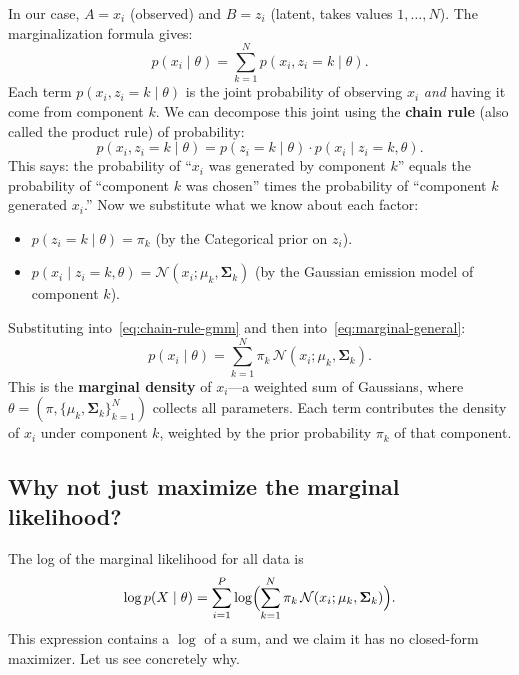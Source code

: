 \documentclass[11pt]{article}
\theoremstyle{definition}
\theoremstyle{plain}
\theoremstyle{remark}
\newcommand{\Sv}{\boldsymbol{\Sigma}}
\begin{document}
In our case, $A=x_i$ (observed) and $B=z_i$ (latent, takes values $1,\dots,N$). The marginalization formula gives:
\begin{equation}
  p(x_i\mid\theta) = \sum_{k=1}^N p(x_i, z_i=k \mid\theta).
  \label{eq:marginal-general}
\end{equation}
Each term $p(x_i, z_i=k\mid\theta)$ is the joint probability of observing $x_i$ \emph{and} having it come from component $k$. We can decompose this joint using the \textbf{chain rule} (also called the product rule) of probability:
\begin{equation}
  p(x_i, z_i=k\mid\theta) = p(z_i=k\mid\theta) \cdot p(x_i\mid z_i=k, \theta).
  \label{eq:chain-rule-gmm}
\end{equation}
This says: the probability of ``$x_i$ was generated by component $k$'' equals the probability of ``component $k$ was chosen'' times the probability of ``component $k$ generated $x_i$.'' Now we substitute what we know about each factor:
\begin{itemize}[leftmargin=*,itemsep=2pt]
  \item $p(z_i=k\mid\theta) = \pi_k$ \quad (by the Categorical prior on $z_i$).
  \item $p(x_i\mid z_i=k,\theta) = \mathcal{N}(x_i;\mu_k,\Sv_k)$ \quad (by the Gaussian emission model of component $k$).
\end{itemize}
Substituting into~\eqref{eq:chain-rule-gmm} and then into~\eqref{eq:marginal-general}:
\begin{equation}
  p(x_i\mid\theta) = \sum_{k=1}^N \pi_k\,\mathcal{N}(x_i;\mu_k,\Sv_k).
\end{equation}
This is the \textbf{marginal density} of $x_i$---a weighted sum of Gaussians, where $\theta=(\pi,\{\mu_k,\Sv_k\}_{k=1}^N)$ collects all parameters. Each term contributes the density of $x_i$ under component $k$, weighted by the prior probability $\pi_k$ of that component.

\subsection{Why not just maximize the marginal likelihood?}

The log of the marginal likelihood for all data is
\begin{equation}
  \log p(X\mid\theta) = \sum_{i=1}^P \log\Bigl(\sum_{k=1}^N \pi_k\,\mathcal{N}(x_i;\mu_k,\Sv_k)\Bigr).
  \label{eq:marginal-ll}
\end{equation}
This expression contains a $\log$ of a sum, and we claim it has no closed-form maximizer. Let us see concretely why.
\end{document}
